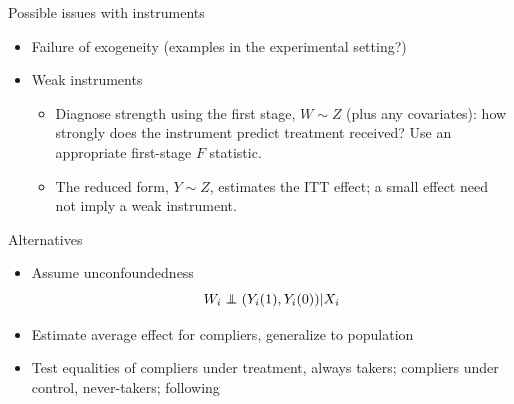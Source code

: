 \documentclass[xcolor={dvipsnames},handout]{beamer}
\begin{document}
\begin{frame}{Possible issues with instruments}

\begin{itemize}
\item Failure of exogeneity  (examples in the experimental setting?)
\item Weak instruments
\begin{itemize}
\item Diagnose strength using the first stage, $W \sim Z$ (plus any covariates): how strongly does the instrument predict treatment received? Use an appropriate first-stage $F$ statistic.
\item The reduced form, $Y \sim Z$, estimates the ITT effect; a small effect need not imply a weak instrument.
\end{itemize}
\end{itemize}

\end{frame}



\begin{frame}{Alternatives}

\begin{itemize}
\item Assume unconfoundedness
$$
W_i \independent (Y_i(1), Y_i(0)) \rvert X_i
$$
\item Estimate average effect for compliers, generalize to population
\item Test equalities of compliers under treatment, always takers; compliers under control, never-takers; following \cite{athey2017econometrics}
\end{itemize}

\end{frame}


\end{document}
